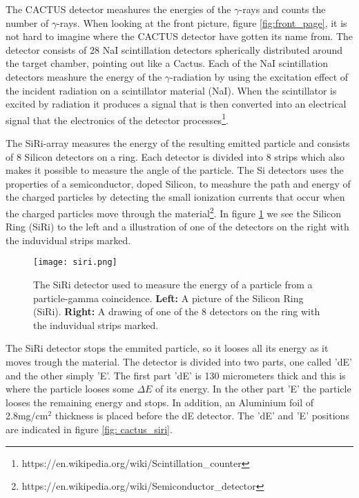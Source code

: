 \documentclass[11pt,a4wide]{article}
\begin{document}
The CACTUS detector meashures the energies of the $\gamma$-rays and counts the number of $\gamma$-rays. When looking at the front picture, figure \ref{fig:front_page}, it is not hard to imagine where the CACTUS detector have gotten its name from. The detector consists of 28 NaI scintillation detectors spherically distributed around the target chamber, pointing out like a Cactus. Each of the NaI scintillation detectors  meashure the energy of the $\gamma$-radiation by using the excitation effect of the incident radiation on a scintillator material (NaI). When the scintillator is excited by radiation it produces a signal that is then converted into an electrical signal that the electronics of the detector processes\footnote{https://en.wikipedia.org/wiki/Scintillation\_counter}. 

The SiRi-array measures the energy of the resulting emitted particle and consists of 8 Silicon detectors on a ring. Each detector is divided into 8 strips which also makes it possible to measure the angle of the particle. The Si detectors uses the properties of a semiconductor, doped Silicon, to meashure the path and energy of the charged particles by detecting the small ionization currents that occur when the charged particles move through the material\footnote{https://en.wikipedia.org/wiki/Semiconductor\_detector}. In figure \ref{fig: siri} we see the Silicon Ring (SiRi) to the left and a illustration of one of the detectors on the right with the induvidual strips marked.
\begin{figure}[htp]
\centering
\texttt{[image: siri.png]}
\caption{The SiRi detector used to measure the energy of a particle from a particle-gamma coincidence. \textbf{Left:} A picture of the Silicon Ring (SiRi). \textbf{Right:} A drawing of one of the 8 detectors on the ring with the induvidual strips marked.}
\label{fig: siri}
\end{figure}

The SiRi detector stops the emmited particle, so it looses all its energy as it moves trough the material. The detector is divided into two parts, one called 'dE' and the other simply 'E'. The first part 'dE' is 130 micrometers thick and this is where the particle looses some $\Delta E$ of its energy. In the other part 'E' the particle looses the remaining energy and stops. In addition, an Aluminium foil of 2.8mg/cm${}^2$ thickness is placed before the dE detector. The 'dE' and 'E' positions are indicated in figure \ref{fig: cactus_siri}.

\end{document}
